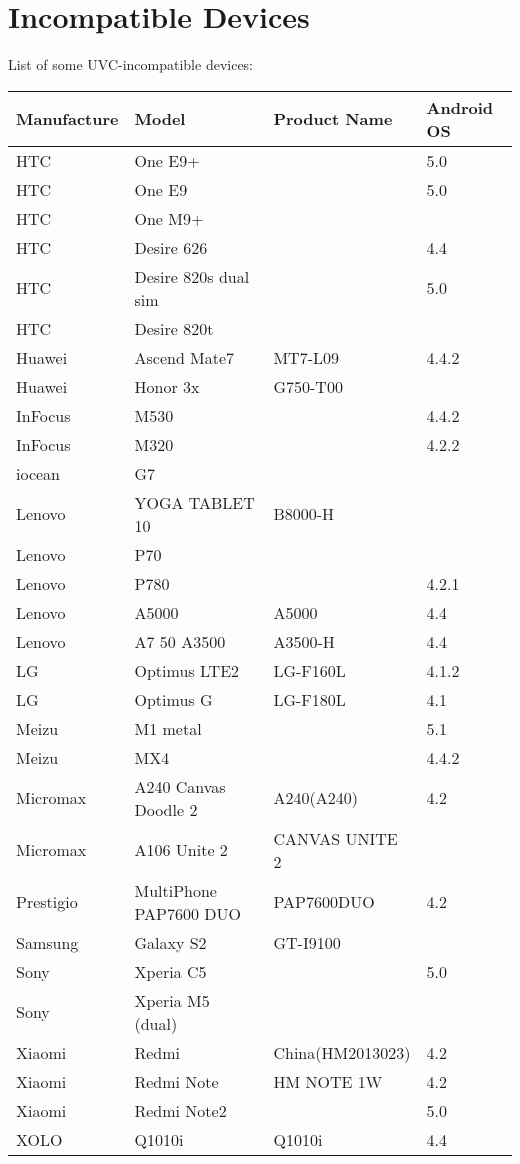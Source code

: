 \begin{appendices}
\begin{longtable}{ | l | l | l | l |}
\end{longtable}

\chapter{Incompatible Devices} 

List of some UVC-incompatible devices: \parencite{camerafi}

 
\begin{longtable}{ | l | l | l | l |}

Manufacture&Model&Product Name&Android OS\\ \hline
HTC&One E9+&&5.0\\ \hline
HTC&One E9&&5.0\\ \hline
HTC&One M9+&&\\ \hline
HTC&Desire 626&&4.4\\ \hline
HTC&Desire 820s dual sim&&5.0\\ \hline
HTC&Desire 820t&&\\ \hline
Huawei&Ascend Mate7&MT7-L09&4.4.2\\ \hline
Huawei&Honor 3x&G750-T00&\\ \hline
InFocus&M530&&4.4.2\\ \hline
InFocus&M320&&4.2.2\\ \hline
iocean&G7&&\\ \hline
Lenovo&YOGA TABLET 10&B8000-H&\\ \hline
Lenovo&P70&&\\ \hline
Lenovo&P780&&4.2.1\\ \hline
Lenovo&A5000&A5000&4.4\\ \hline
Lenovo&A7 50 A3500&A3500-H&4.4\\ \hline
LG&Optimus LTE2&LG-F160L&4.1.2\\ \hline
LG&Optimus G&LG-F180L&4.1\\ \hline
Meizu&M1 metal&&5.1\\ \hline
Meizu&MX4&&4.4.2\\ \hline
Micromax&A240 Canvas Doodle 2&A240(A240)&4.2\\ \hline
Micromax&A106 Unite 2&CANVAS UNITE 2&\\ \hline
Prestigio&MultiPhone PAP7600 DUO&PAP7600DUO&4.2\\ \hline
Samsung&Galaxy S2&GT-I9100&\\ \hline
Sony&Xperia C5&&5.0\\ \hline
Sony&Xperia M5 (dual)&&\\ \hline
Xiaomi&Redmi&China(HM2013023)&4.2\\ \hline
Xiaomi&Redmi Note&HM NOTE 1W&4.2\\ \hline
Xiaomi&Redmi Note2&&5.0\\ \hline
XOLO&Q1010i&Q1010i&4.4\\ \hline
\end{longtable}



\end{appendices}
